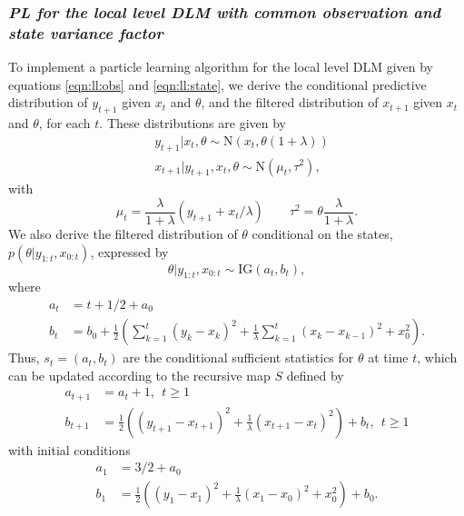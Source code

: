 \subsubsection{\emph{PL for the local level DLM with common observation and state variance factor} \label{sec:pl:ll}}

To implement a particle learning algorithm for the local level DLM given by equations \eqref{eqn:ll:obs} and \eqref{eqn:ll:state}, we derive the conditional predictive distribution of $y_{t+1}$ given $x_t$ and $\theta$, and the filtered distribution of $x_{t+1}$ given $x_t$ and $\theta$, for each $t$. These distributions are given by
\begin{align}
&y_{t+1}|x_t,\theta \sim \mbox{N}\left(x_t,\theta(1+\lambda)\right) \label{eqn:pl:ll:pred} \\
&x_{t+1}|y_{t+1},x_t,\theta \sim \mbox{N}(\mu_t,\tau^2) \label{eqn:pl:ll:state},
\end{align}
with
\begin{equation}
\mu_t = \frac{\lambda}{1+\lambda}(y_{t+1} + x_t / \lambda) \qquad \tau^2 = \theta\frac{\lambda}{1+\lambda}. \label{eqn:pl:ll:statemv}
\end{equation}
We also derive the filtered distribution of $\theta$ conditional on the states, $p(\theta|y_{1:t},x_{0:t})$, expressed by
\begin{equation}
\theta|y_{1:t},x_{0:t} \sim \mbox{IG}(a_t,b_t),
\end{equation}
where
\begin{align*}
a_t &= t + 1/2 + a_0 \\
b_t &= b_0 + \frac{1}{2}\left(\sum_{k=1}^t (y_k - x_k)^2 + \frac{1}{\lambda}\sum_{k=1}^t (x_k - x_{k-1})^2 + x_0^2\right).
\end{align*}
Thus, $s_t = (a_t,b_t)$ are the conditional sufficient statistics for $\theta$ at time $t$, which can be updated according to the recursive map $S$ defined by
\begin{align}
a_{t+1} &= a_t + 1, \ \ t \ge 1 \label{eqn:pl:ll:a} \\
b_{t+1} &= \frac{1}{2}\left((y_{t+1}-x_{t+1})^2 + \frac{1}{\lambda}(x_{t+1}-x_t)^2\right) + b_t, \ \ t \ge 1 \label{eqn:pl:ll:b}
\end{align}
with initial conditions
\begin{align*}
a_1 &= 3/2 + a_0 \\
b_1 &= \frac{1}{2}\left((y_1-x_1)^2 + \frac{1}{\lambda}(x_1-x_0)^2 + x_0^2\right) + b_0.
\end{align*}

